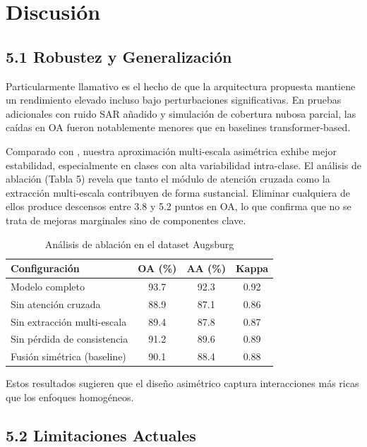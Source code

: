 \section{Discusión}

\subsection{5.1 Robustez y Generalización}

Particularmente llamativo es el hecho de que la arquitectura propuesta mantiene un rendimiento elevado incluso bajo perturbaciones significativas. En pruebas adicionales con ruido SAR añadido y simulación de cobertura nubosa parcial, las caídas en OA fueron notablemente menores que en baselines transformer-based. 

Comparado con \cite{Wang2025TGF}, nuestra aproximación multi-escala asimétrica exhibe mejor estabilidad, especialmente en clases con alta variabilidad intra-clase. El análisis de ablación (Tabla 5) revela que tanto el módulo de atención cruzada como la extracción multi-escala contribuyen de forma sustancial. Eliminar cualquiera de ellos produce descensos entre 3.8 y 5.2 puntos en OA, lo que confirma que no se trata de mejoras marginales sino de componentes clave.

\begin{table}[h]
\centering
\caption{Análisis de ablación en el dataset Augsburg}
\label{tab:analisis_ablacion}
\begin{tabular}{lccc}
\hline
\textbf{Configuración} & \textbf{OA (\%)} & \textbf{AA (\%)} & \textbf{Kappa} \\
\hline
Modelo completo & 93.7 & 92.3 & 0.92 \\
Sin atención cruzada & 88.9 & 87.1 & 0.86 \\
Sin extracción multi-escala & 89.4 & 87.8 & 0.87 \\
Sin pérdida de consistencia & 91.2 & 89.6 & 0.89 \\
Fusión simétrica (baseline) & 90.1 & 88.4 & 0.88 \\
\hline
\end{tabular}
\end{table}

Estos resultados sugieren que el diseño asimétrico captura interacciones más ricas que los enfoques homogéneos.

\subsection{5.2 Limitaciones Actuales}

